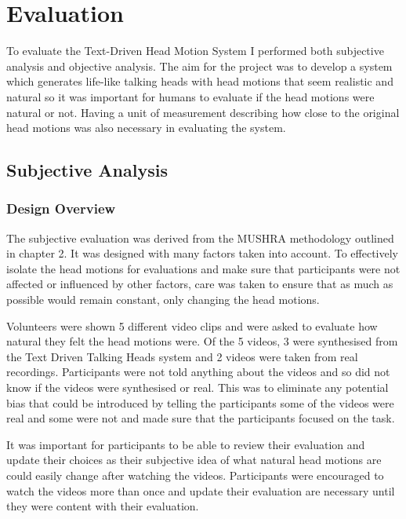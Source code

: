 \documentclass[bsc,frontabs,twoside,singlespacing,parskip]{infthesis}
\begin{document}
\chapter{Evaluation}

To evaluate the Text-Driven Head Motion System I performed both subjective analysis and objective analysis. The aim for the project was to develop a system which generates life-like talking heads with head motions that seem realistic and natural so it was important for humans to evaluate if the head motions were natural or not. Having a unit of measurement describing how close to the original head motions was also necessary in evaluating the system.

\section{Subjective Analysis}

\subsection{Design Overview}

The subjective evaluation was derived from the MUSHRA methodology outlined in chapter 2. It was designed with many factors taken into account. To effectively isolate the head motions for evaluations and make sure that participants were not affected or influenced by other factors, care was taken to ensure that as much as possible would remain constant, only changing the head motions.

Volunteers were shown 5 different video clips and were asked to evaluate how natural they felt the head motions were. Of the 5 videos, 3 were synthesised from the Text Driven Talking Heads system and 2 videos were taken from real recordings. Participants were not told anything about the videos and so did not know if the videos were synthesised or real. This was to eliminate any potential bias that could be introduced by telling the participants some of the videos were real and some were not and made sure that the participants focused on the task.

It was important for participants to be able to review their evaluation and update their choices as their subjective idea of what natural head motions are could easily change after watching the videos. Participants were encouraged to watch the videos more than once and update their evaluation are necessary until they were content with their evaluation.
\end{document}
